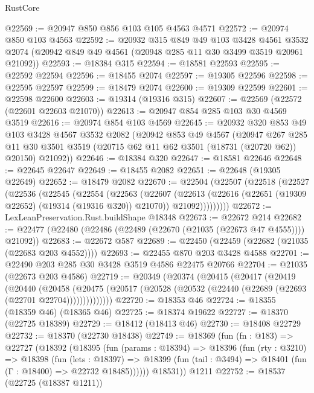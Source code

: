 \begin{lexlean}{RustCore}
\begin{coremodule}
@22569 := @20947 @850 @856 @103 @105 @4563 @4571
@22572 := @20974 @850 @103 @4563
@22592 := @20932
    @315
    @849
    @49
    @103
    @3428
    @4561
    @3532
    @2074
    (@20942 @849 @49 @4561 (@20948 @285 @11 @30 @3499 @3519 @20961 @21092))
@22593 := @18384 @315
@22594 := @18581 @22593
@22595 := @22592 @22594
@22596 := @18455 @2074
@22597 := @19305 @22596
@22598 := @22595 @22597
@22599 := @18479 @2074
@22600 := @19309 @22599
@22601 := @22598 @22600
@22603 := @19314 (@19316 @315)
@22607 := @22569 (@22572 (@22601 @22603 @21070))
@22613 := @20947 @854 @285 @103 @30 @4569 @3519
@22616 := @20974 @854 @103 @4569
@22645 := @20932
    @320
    @853
    @49
    @103
    @3428
    @4567
    @3532
    @2082
    (@20942
      @853
      @49
      @4567
      (@20947
        @267
        @285
        @11
        @30
        @3501
        @3519
        (@20715 @62 @11 @62 @3501 (@18731 (@20720 @62)) @20150)
        @21092))
@22646 := @18384 @320
@22647 := @18581 @22646
@22648 := @22645 @22647
@22649 := @18455 @2082
@22651 := @22648 (@19305 @22649)
@22652 := @18479 @2082
@22670 := @22504
    (@22507
      (@22518
        (@22527
          (@22536
            (@22545
              (@22554
                (@22563
                  (@22607
                    (@22613
                      (@22616 (@22651 (@19309 @22652) (@19314 (@19316 @320)) @21070))
                      @21092)))))))))
@22672 := LexLeanPreservation.Rust.buildShape @18348
@22673 := @22672 @214
@22682 := @22477 (@22480 (@22486 (@22489 (@22670 (@21035 (@22673 @47 @4555)))) @21092))
@22683 := @22672 @587
@22689 := @22450 (@22459 (@22682 (@21035 (@22683 @203 @4552))))
@22693 := @22455 @870 @203 @3428 @4588
@22701 := @22490 @203 @285 @30 @3428 @3519 @4586 @22475 @20766
@22704 := @21035 (@22673 @203 @4586)
@22719 := @20349
    (@20374
      (@20415
        (@20417
          (@20419
            (@20440
              (@20458
                (@20475 (@20517 (@20528 (@20532 (@22440 (@22689 (@22693 (@22701 @22704))))))))))))))
@22720 := @18353 @46
@22724 := @18355 (@18359 @46) (@18365 @46)
@22725 := @18374 @19622
@22727 := @18370 (@22725 @18389)
@22729 := @18412 (@18413 @46)
@22730 := @18408 @22729
@22732 := @18370 (@22730 @18438)
@22749 := @18369
    (fun (fn : @183) =>
    @22727
      (@18392
        (@18395
          (fun (params : @18394) =>
          @18396
            (fun (rty : @3210) =>
            @18398
              (fun (lets : @18397) =>
              @18399 (fun (tail : @3494) => @18401 (fun (Γ : @18400) => @22732 @18485))))))
        @18531))
    @1211
@22752 := @18537 (@22725 (@18387 @1211))

\end{coremodule}
\end{lexlean}
